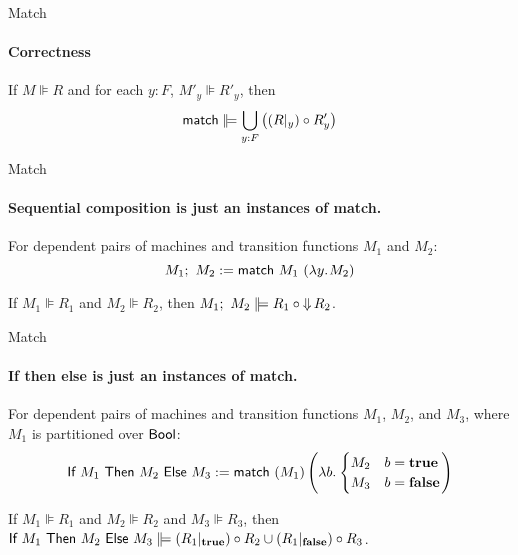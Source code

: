 \begin{frame}{Match}
  \framesubtitle{Correctness}
  \begin{lemma}
    If $M \VDash R$ and for each $y:F$, $M'_y \VDash R'_y$, then
    $$\MS{match} \VDash \bigcup_{y:F} \left( (R \at y) \circ R'_y \right)$$
  \end{lemma}
\end{frame}

\begin{frame}{Match}
  \framesubtitle{Sequential composition is just an instances of match.}
  \begin{definition}
    For dependent pairs of machines and transition functions $M_1$ and $M_2$:
    $$M_1 ;~ M_2 := \textsf{match}~M_1~(\lambda y{.}\hskip.7ptM_2)$$
  \end{definition}

  \begin{corollary}
    If $M_1 \VDash R_1$ and $M_2 \VDash R_2$, then $M_1 \mseq M_2 \VDash R_1 \circ \hideParam R_2$.
  \end{corollary}
\end{frame}

\begin{frame}{Match}
  \framesubtitle{If then else is just an instances of match.}
  \begin{definition}[Boolean if]
    For dependent pairs of machines and transition functions $M_1$, $M_2$, and $M_3$,
    where $M_1$ is partitioned over $\textsf{Bool}$:
    $$ \textsf{If}~M_1~\textsf{Then}~M_2~\textsf{Else}~M_3 := \textsf{match}~(M_1) \left(\lambda b{.}\hskip.7pt\begin{cases} M_2 & b = \mathbf{true} \\ M_3 & b = \mathbf{false} \end{cases} \right) $$
  \end{definition}

  \begin{corollary}
    If $M_1 \VDash R_1$ and $M_2 \VDash R_2$ and $M_3 \VDash R_3$, then
    $\mif{M_1}{M_2}{M_3} \VDash (R_1 \at \true) \circ R_2 \cup (R_1 \at \false) \circ R_3$.
  \end{corollary}
\end{frame}

